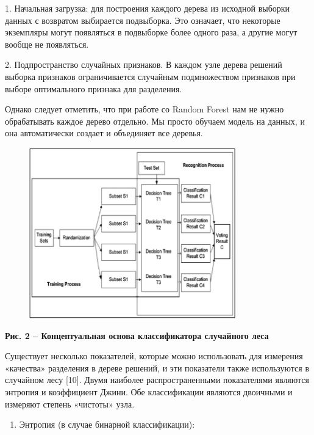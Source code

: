 1. Начальная загрузка: для построения каждого дерева из исходной выборки
данных с возвратом выбирается подвыборка. Это означает, что некоторые
экземпляры могут появляться в подвыборке более одного раза, а другие
могут вообще не появляться.

2. Подпространство случайных признаков. В каждом узле дерева решений
выборка признаков ограничивается случайным подмножеством признаков при
выборе оптимального признака для разделения.

Однако следует отметить, что при работе со Random Forest нам не нужно
обрабатывать каждое дерево отдельно. Мы просто обучаем модель на данных,
и она автоматически создает и объединяет все деревья.

\begin{figure}[H]
	\centering
	\includegraphics[width=0.8\textwidth]{assets/30}
	\caption*{}
\end{figure}

{\bfseries Рис. 2 -- Концептуальная основа классификатора случайного леса}

Существует несколько показателей, которые можно использовать для
измерения «качества» разделения в дереве решений, и эти показатели также
используются в случайном лесу {[}10{]}. Двумя наиболее распространенными
показателями являются энтропия и коэффициент Джини. Обе классификации
являются двоичными и измеряют степень «чистоты» узла.

\begin{enumerate}
\def\labelenumi{\arabic{enumi}.}
\item
  Энтропия (в случае бинарной классификации):
\end{enumerate}

